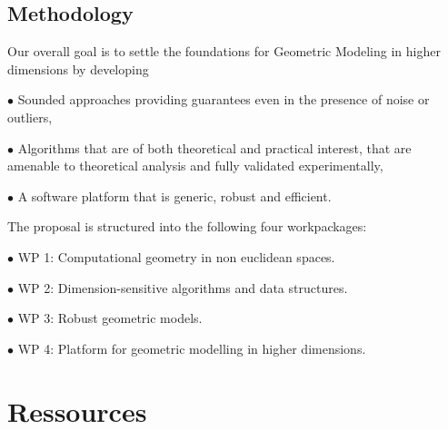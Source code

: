 





\subsection{Methodology}

Our overall goal is to settle the foundations for Geometric Modeling in higher dimensions by
developing 

\sind $\bullet$ Sounded approaches providing guarantees even in the presence of noise or outliers,


\sind $\bullet$  Algorithms that are of both theoretical and practical interest, that are amenable to theoretical analysis and fully validated experimentally,

\sind $\bullet$ A software platform that is generic, robust and efficient.

The proposal is structured into the following four workpackages:


\sind $\bullet$  {WP 1: Computational geometry in non euclidean spaces.} 


\sind $\bullet$  {WP 2:  Dimension-sensitive algorithms and data structures.} 


\sind $\bullet$  {WP 3: Robust geometric models.}


\sind $\bullet$  {WP 4:  Platform for geometric modelling in higher dimensions. } 


%

%






\section{Ressources}


